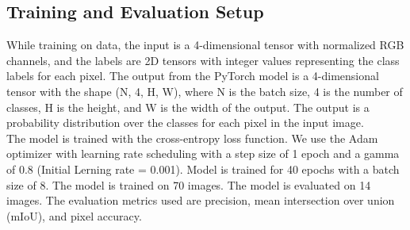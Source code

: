 \subsection{Training and Evaluation Setup}
While training on data, the input is a 4-dimensional tensor with normalized RGB channels, and the labels are 2D tensors with integer values representing the class labels for each pixel. The output from the PyTorch model is a 4-dimensional tensor with the shape (N, 4, H, W), where N is the batch size, 4 is the number of classes, H is the height, and W is the width of the output. The output is a probability distribution over the classes for each pixel in the input image. \\
The model is trained with the cross-entropy loss function. We use the Adam optimizer with learning rate scheduling with a step size of 1 epoch and a gamma of 0.8 (Initial Lerning rate = 0.001). Model is trained for 40 epochs with a batch size of 8. The model is trained on 70 images. The model is evaluated on 14 images. The evaluation metrics used are precision, mean intersection over union (mIoU), and pixel accuracy. 

 
